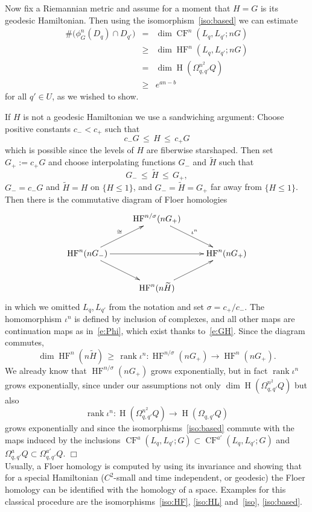 \documentclass[12pt,twoside]{amsart}
\theoremstyle{plain}
\numberwithin{figure}{section}
\numberwithin{equation}{section}
\newcommand{\proofend}{\hspace*{\fill} $\Box$\\}
\def\rank{\operatorname{rank}}
\def\H{\operatorname{H}}
\def\CF{\operatorname{CF}}
\def\HF{\operatorname{HF}}
\def\gs{\sigma}
\begin{document}
Now fix a Riemannian metric and assume for a moment that $H=G$ is its geodesic Hamiltonian.
Then using the isomorphism~\eqref{iso:based} we can estimate
\begin{eqnarray*}
\# \bigl( \phi_G^n (D_q) \cap D_{q'} \bigr) &=& \dim \CF^n (L_q ,L_{q'}; nG) \\
&\geqslant& \dim \HF^n (L_q, L_{q'}; nG) \\
&=& \dim \H (\Omega_{q,q'}^{n^2}Q) \\
&\geqslant& e^{an-b} \quad 
\end{eqnarray*}
for all $q' \in U$, as we wished to show.

If $H$ is not a geodesic Hamiltonian we use a sandwiching argument: 
Choose positive constants $c_- < c_+$ such that
$$
c_-G \,\leqslant\, H \,\leqslant\, c_+ G 
$$
which is possible since the levels of $H$ are fiberwise starshaped.
Then set $G_+ := c_+G$ and choose interpolating functions $G_-$ and $\widetilde H$ 
such that
\begin{equation} \label{e:GH}
G_- \,\leqslant\, \widetilde H \,\leqslant\, G_+ ,
\end{equation}
$G_- = c_-G$ and $\widetilde H = H$ on $\{ H \leqslant 1\}$,
and $G_- = \widetilde H = G_+$ far away from $\{ H \leqslant 1\}$.
Then there is the commutative diagram of Floer homologies 
%
$$  
\xymatrix{ 
&\HF^{n/\gs}(nG_+) \ar[dr]^{\iota^n}& \\
\HF^{n}(nG_-) \ar[ur]^{\cong}
\ar[rr]
\ar[dr] && \HF^{n}(nG_+) \\
& \HF^{n}(n\widetilde H) \ar[ur]&}
$$
%
in which we omitted $L_q,L_{q'}$ from the notation and set $\gs = c_+/c_-$.
The homomorphism $\iota^n$ is defined by inclusion of complexes, 
and all other maps are continuation maps as in~\eqref{e:Phi}, which exist thanks to~\eqref{e:GH}.
Since the diagram commutes, 
$$
\dim \HF^{n} (n\widetilde H) \,\geqslant\, 
\rank \iota^n \colon \HF^{n/\gs}(nG_+) \to \HF^{n}(nG_+) .
$$
We already know that $\HF^{n/\gs}(nG_+)$ grows exponentially, 
but in fact $\rank \iota^n$ grows exponentially, since under our assumptions
not only $\dim \H (\Omega_{q,q'}^{n^2}Q)$ but also
$$
\rank \iota^n \colon \H (\Omega_{q,q'}^{n^2}Q) \to \H (\Omega_{q,q'}Q)
$$ 
grows exponentially
and since the isomorphisms~\eqref{iso:based} commute with the maps induced by the inclusions 
$\CF^{a}(L_q,L_{q'};G) \subset \CF^{a'}(L_q,L_{q'};G)$ and $\Omega_{q,q'}^aQ \subset \Omega_{q,q'}^{a'}Q$.
\proofend


Usually, a Floer homology is computed by using its invariance and showing
that for a special Hamiltonian ($C^2$-small and time independent, or geodesic)
the Floer homology can be identified with the homology of a space. 
Examples for this classical procedure are the isomorphisms~\eqref{iso:HF}, \eqref{iso:HL}
and~\eqref{iso}, \eqref{iso:based}.
\end{document}
